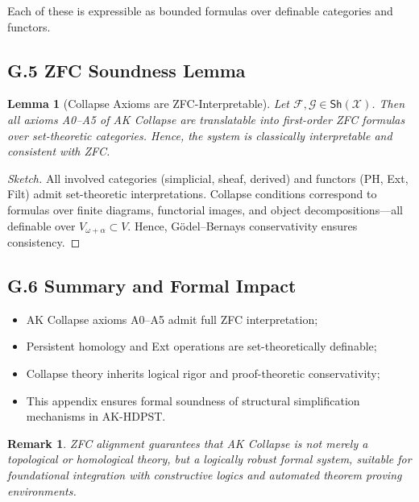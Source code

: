 \documentclass[11pt]{article}
\newtheorem{remark}[theorem]{Remark}
\newtheorem{lemma}[theorem]{Lemma}
\begin{document}
Each of these is expressible as bounded formulas over definable categories and functors.

\subsection*{G.5 ZFC Soundness Lemma}

\begin{lemma}[Collapse Axioms are ZFC-Interpretable]
Let \( \mathcal{F}, \mathcal{G} \in \mathsf{Sh}(\mathcal{X}) \). Then all axioms A0–A5 of AK Collapse  
are translatable into first-order ZFC formulas over set-theoretic categories.  
Hence, the system is classically interpretable and consistent with ZFC.
\end{lemma}

\begin{proof}[Sketch]
All involved categories (simplicial, sheaf, derived) and functors (PH, Ext, Filt) admit set-theoretic interpretations.  
Collapse conditions correspond to formulas over finite diagrams, functorial images, and object decompositions—all  
definable over \( V_{\omega + \alpha} \subset V \). Hence, Gödel–Bernays conservativity ensures consistency.
\end{proof}

\subsection*{G.6 Summary and Formal Impact}

\begin{itemize}
  \item AK Collapse axioms A0–A5 admit full ZFC interpretation;
  \item Persistent homology and Ext operations are set-theoretically definable;
  \item Collapse theory inherits logical rigor and proof-theoretic conservativity;
  \item This appendix ensures formal soundness of structural simplification mechanisms in AK-HDPST.
\end{itemize}

\begin{remark}
ZFC alignment guarantees that AK Collapse is not merely a topological or homological theory,  
but a logically robust formal system, suitable for foundational integration with constructive logics and  
automated theorem proving environments.
\end{remark}
\end{document}
